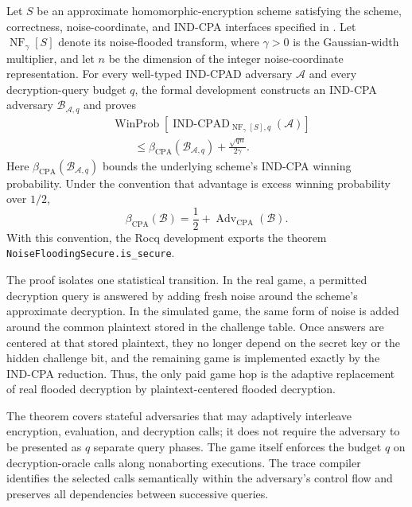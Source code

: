 Let $S$ be an approximate homomorphic-encryption scheme satisfying the scheme, correctness, noise-coordinate, and IND-CPA interfaces specified in . Let $\operatorname{NF}_{\gamma}[S]$ denote its noise-flooded transform, where $\gamma>0$ is the Gaussian-width multiplier, and let $n$ be the dimension of the integer noise-coordinate representation. For every well-typed IND-CPAD adversary $\mathcal{A}$ and every decryption-query budget $q$, the formal development constructs an IND-CPA adversary $\mathcal{B}_{\mathcal{A},q}$ and proves
\begin{equation}
\begin{aligned}
&\operatorname{WinProb}\!\left[
\operatorname{IND\text{-}CPAD}_{
\operatorname{NF}_{\gamma}[S],q
}(\mathcal{A})
\right]
\\
&\qquad\leq
\beta_{\mathrm{CPA}}\!\left(
\mathcal{B}_{\mathcal{A},q}
\right)
+
\frac{\sqrt{qn}}{2\gamma}.
\end{aligned}
\label{eq:intro-main-bound}
\end{equation}
Here $\beta_{\mathrm{CPA}}(\mathcal{B}_{\mathcal{A},q})$ bounds the underlying scheme's IND-CPA winning probability. Under the convention that advantage is excess winning probability over $1/2$,
\[
\beta_{\mathrm{CPA}}(\mathcal{B})
=
\frac{1}{2}
+
\operatorname{Adv}_{\mathrm{CPA}}(\mathcal{B}).
\]
With this convention, the Rocq development exports the theorem
\mbox{\texttt{NoiseFloodingSecure.is\_secure}}.

The proof isolates one statistical transition. In the real game, a permitted decryption query is answered by adding fresh noise around the scheme's approximate decryption. In the simulated game, the same form of noise is added around the common plaintext stored in the challenge table. Once answers are centered at that stored plaintext, they no longer depend on the secret key or the hidden challenge bit, and the remaining game is implemented exactly by the IND-CPA reduction. Thus, the only paid game hop is the adaptive replacement of real flooded decryption by plaintext-centered flooded decryption.

The theorem covers stateful adversaries that may adaptively interleave encryption, evaluation, and decryption calls; it does not require the adversary to be presented as $q$ separate query phases. The game itself enforces the budget $q$ on decryption-oracle calls along nonaborting executions. The trace compiler identifies the selected calls semantically within the adversary's control flow and preserves all dependencies between successive queries.

